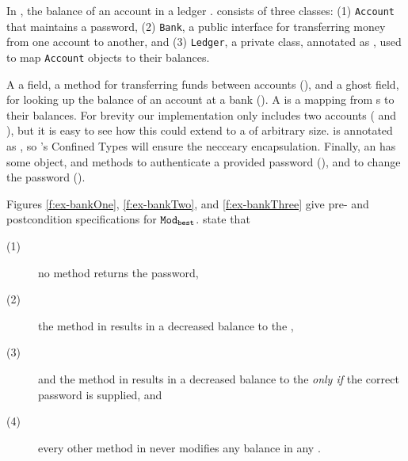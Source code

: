  
In \ModD,   the balance 
of an account  in a ledger .
 \ModD   consists of three classes: (1) \texttt{Account} that
maintains a password, (2) \texttt{Bank}, a public interface 
for transferring money from one account to another, and (3) \texttt{Ledger},
a private class, annotated as \enclosed, used to map \texttt{Account} objects
to their balances.  
 

A    a  field, a method for transferring 
funds between accounts (), and a ghost field,  
for looking up the balance of an account at a bank ().
A  is
a mapping from s to their balances. For brevity
our implementation only includes two accounts ( and ),
but it is easy to see how this could extend to a 
of arbitrary size.  is annotated as \enclosed, so
\Loo's Confined Types will ensure the necceary encapsulation.
Finally, an  has some  object, and 
methods to authenticate a provided password (), 
and to change the password ().

 

Figures \ref{f:ex-bankOne},  \ref{f:ex-bankTwo},
and  \ref{f:ex-bankThree} give pre- and postcondition specifications for ${\texttt{Mod}}_{{\texttt{best}}}$.
  state that 
\begin{description}
\item[(1)] no method returns the password, 
\item[(2)] the  method in  results in a decreased balance to the  ,
\item[(3)] and the  method in  results in a decreased balance to the   \emph{only if} the correct password is supplied, and
\item[(4)] every other method in \ModD never modifies any balance in any .
\end{description} 



